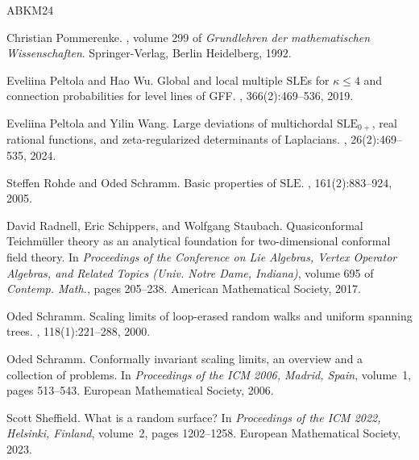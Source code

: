 \documentclass[a4paper, 11pt]{article}
\theoremstyle{definition}
\numberwithin{equation}{section}
\numberwithin{figure}{section}
\begin{document}
\begin{thebibliography}{ABKM24}


Christian Pommerenke.
, volume 299 of {\em
  Grundlehren der mathematischen Wissenschaften}.
\newblock Springer-Verlag, Berlin Heidelberg, 1992.


Eveliina Peltola and Hao Wu.
\newblock Global and local multiple $\mathrm{SLE}$s for $\kappa \leq 4$ and
  connection probabilities for level lines of {GFF}.
, 366(2):469--536, 2019.

Eveliina Peltola and Yilin Wang.
\newblock Large deviations of multichordal {$\mathrm{SLE}_{0+}$}, real rational
  functions, and zeta-regularized determinants of {L}aplacians.
, 26(2):469--535, 2024.

Steffen Rohde and Oded Schramm.
\newblock Basic properties of $\mathrm{SLE}$.
, 161(2):883--924, 2005.

David Radnell, Eric Schippers, and Wolfgang Staubach.
\newblock Quasiconformal {T}eichm{\"u}ller theory as an analytical foundation
  for two-dimensional conformal field theory.
\newblock In {\em Proceedings of the Conference on Lie Algebras, Vertex
  Operator Algebras, and Related Topics (Univ. Notre Dame, Indiana)}, volume
  695 of {\em Contemp. Math.}, pages 205--238. American Mathematical Society,
  2017.

Oded Schramm.
\newblock Scaling limits of loop-erased random walks and uniform spanning
  trees.
, 118(1):221--288, 2000.

Oded Schramm.
\newblock Conformally invariant scaling limits, an overview and a collection of
  problems.
\newblock In {\em Proceedings of the ICM 2006, Madrid, Spain}, volume~1, pages
  513--543. European Mathematical Society, 2006.

Scott Sheffield.
\newblock What is a random surface?
\newblock In {\em Proceedings of the ICM 2022, Helsinki, Finland}, volume~2,
  pages 1202--1258. European Mathematical Society, 2023.


\end{thebibliography}
\end{document}
